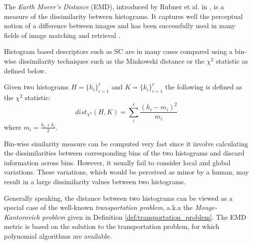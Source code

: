 \iftoggle{edit-mode}{\hspace{0pt}\marginpar{Introduction to EMD}}{}
The \emph{Earth Mover's Distance} (EMD), introduced by Rubner et al. in \cite{rubner2000earth}, is a measure of the dissimilarity between histograms. 
It captures well the perceptual notion of a difference between images and has been successfully used in many fields of image matching and retrieval \cite{grauman2004fast, rubner2000earth}.

\iftoggle{edit-mode}{\hspace{0pt}\marginpar{Bin-wise based measures}}{}
Histogram based descriptors such as SC are in many cases compared using a bin-wise dissimilarity techniques such as the Minkowski distance or the $\chi^2$ statistic as defined below.
 
\begin{definition}
Given two histograms $H=\{h_i\}_{i=1}^{\ell}$ and $K=\{k_i\}_{i=1}^{\ell}$ the following is defined as the $\chi^2$ statistic: 
\begin{equation}
dist_{\chi^2}(H,K)=\sum_{i}^{\ell} \frac{(h_i - m_i)^2}{m_i}
\end{equation}
where $m_i=\frac{h_i+k_i}{2}$.
\end{definition}

\iftoggle{edit-mode}{\hspace{0pt}\marginpar{Drawback of bin-wise based measures}}{}
Bin-wise similarity measure can be computed very fast since it involve calculating the dissimilarities between corresponding bins of the two histograms and discard information across bins. 
However, it usually fail to consider local and global variations. 
These variations, which would be perceived as minor by a human, may result in a large dissimilarity values between two histograms.

\iftoggle{edit-mode}{\hspace{0pt}\marginpar{The transportation problem}}{}
Generally speaking, the distance between two histograms can be viewed as a special case of the well-known \emph{transportation problem}, a.k.a the \emph{Monge-Kantorovich problem} \cite{rachev1985monge} given in Definition \ref{def:transportation_problem}. 
The EMD metric is based on the solution to the transportation problem, for which polynomial algorithms are available.

